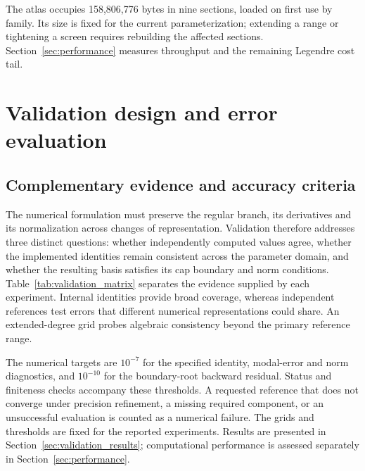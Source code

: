 ﻿\documentclass[11pt,a4paper]{article}
\begin{document}
The atlas occupies 158,806,776 bytes in nine sections, loaded on first use by family. Its size is fixed for the current parameterization; extending a range or tightening a screen requires rebuilding the affected sections. Section~\ref{sec:performance} measures throughput and the remaining Legendre cost tail.

\section{Validation design and error evaluation}
\label{sec:validation_design}

\subsection{Complementary evidence and accuracy criteria}
\label{sec:validation_layers}

The numerical formulation must preserve the regular branch, its derivatives and its normalization across changes of representation. Validation therefore addresses three distinct questions: whether independently computed values agree, whether the implemented identities remain consistent across the parameter domain, and whether the resulting basis satisfies its cap boundary and norm conditions. Table~\ref{tab:validation_matrix} separates the evidence supplied by each experiment. Internal identities provide broad coverage, whereas independent references test errors that different numerical representations could share. An extended-degree grid probes algebraic consistency beyond the primary reference range.

The numerical targets are $10^{-7}$ for the specified identity, modal-error and norm diagnostics, and $10^{-10}$ for the boundary-root backward residual. Status and finiteness checks accompany these thresholds. A requested reference that does not converge under precision refinement, a missing required component, or an unsuccessful evaluation is counted as a numerical failure. The grids and thresholds are fixed for the reported experiments. Results are presented in Section~\ref{sec:validation_results}; computational performance is assessed separately in Section~\ref{sec:performance}.
\end{document}

